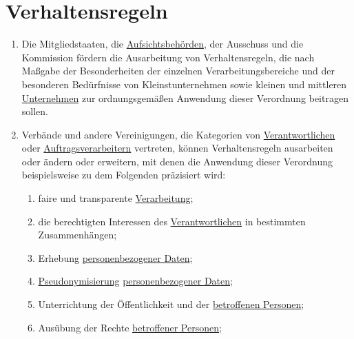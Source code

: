 \chapter{Verhaltensregeln}
\label{ch:40}


\begin{enumerate}

  \item Die Mitgliedstaaten, die \hyperref[itm:04-21]{Aufsichtsbehörden}, der Ausschuss und die Kommission fördern die
   Ausarbeitung von Verhaltensregeln, die nach Maßgabe der Besonderheiten der einzelnen Verarbeitungsbereiche und der
   besonderen Bedürfnisse von Kleinstunternehmen sowie kleinen und mittleren \hyperref[itm:04-18]{Unternehmen} zur
   ordnungsgemäßen Anwendung dieser Verordnung beitragen sollen.
  \label{itm:40-1}

  \item Verbände und andere Vereinigungen, die Kategorien von \hyperref[itm:04-7]{Verantwortlichen} oder \hyperref
   [itm:04-8]{Auftragsverarbeitern} vertreten, können Verhaltensregeln ausarbeiten oder ändern oder erweitern, mit
   denen die Anwendung dieser Verordnung beispielsweise zu dem Folgenden präzisiert wird:
  \label{itm:40-2}

  \begin{enumerate}
  
    \item faire und transparente \hyperref[itm:04-2]{Verarbeitung};
    \label{itm:40-2a}

    \item die berechtigten Interessen des \hyperref[itm:04-7]{Verantwortlichen} in bestimmten Zusammenhängen;
    \label{itm:40-2b}

    \item Erhebung \hyperref[itm:04-1]{personenbezogener Daten};
    \label{itm:40-2c}

    \item \hyperref[itm:04-5]{Pseudonymisierung} \hyperref[itm:04-1]{personenbezogener Daten};
    \label{itm:40-2d}

    \item Unterrichtung der Öffentlichkeit und der \hyperref[itm:04-1]{betroffenen Personen};
    \label{itm:40-2e}

    \item Ausübung der Rechte \hyperref[itm:04-1]{betroffener Personen};
    \label{itm:40-2f}


\end{enumerate}
\end{enumerate}
